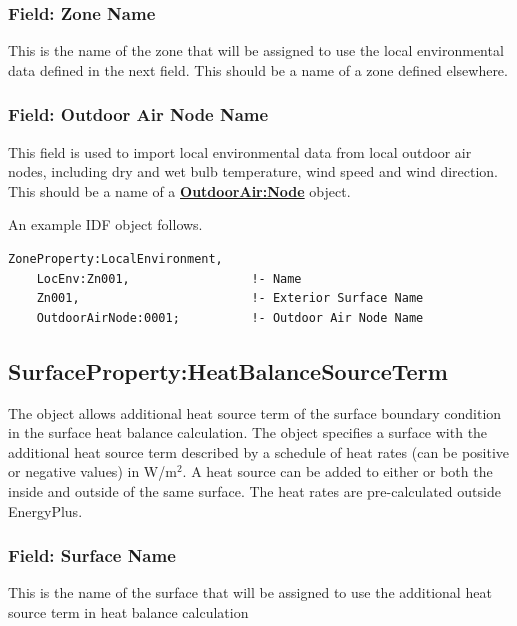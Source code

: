 \subsubsection{Field: Zone Name}\label{ZonePropertylocalEnvironment-field-zone-name}

This is the name of the zone that will be assigned to use the local environmental data defined in the next field. This should be a name of a zone defined elsewhere.

\subsubsection{Field: Outdoor Air Node Name}\label{field-zone-outdoor-air-node-name}

This field is used to import local environmental data from local outdoor air nodes, including dry and wet bulb temperature, wind speed and wind direction. This should be a name of a \textbf{\hyperref[outdoorairnode]{OutdoorAir:Node}} object.

An example IDF object follows.

\begin{lstlisting}
ZoneProperty:LocalEnvironment,
    LocEnv:Zn001,                 !- Name
    Zn001,                        !- Exterior Surface Name
    OutdoorAirNode:0001;          !- Outdoor Air Node Name
\end{lstlisting}

\subsection{SurfaceProperty:HeatBalanceSourceTerm}\label{surfacePropertyHeatBalanceSourceTerm}

The object allows additional heat source term of the surface boundary condition in the surface heat balance calculation. The object specifies a surface with the additional heat source term described by a schedule of heat rates (can be positive or negative values) in W/m\(^2\). A heat source can be added	to either or both the inside and outside of the same surface. The heat rates are pre-calculated outside EnergyPlus.

\subsubsection{Field: Surface Name}\label{surfacePropertyHeatBalanceSourceTerm-field-surface-name}

This is the name of the surface that will be assigned to use the additional heat source term in heat balance calculation

